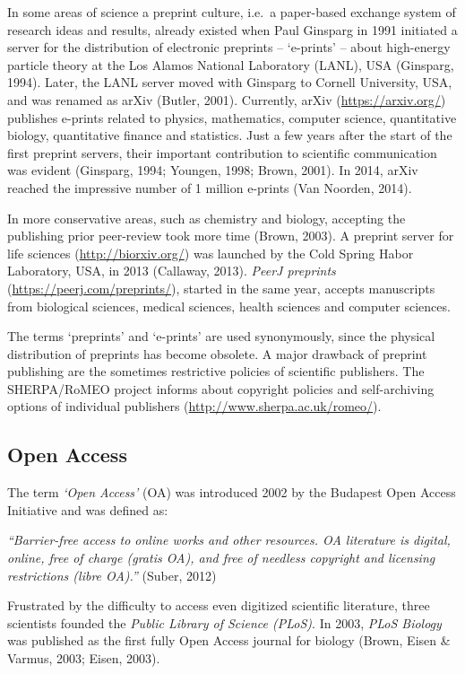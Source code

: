 \documentclass[10pt,fleqn]{wlpeerj}
\begin{document}
In some areas of science a preprint culture, i.e.~a paper-based exchange
system of research ideas and results, already existed when Paul Ginsparg
in 1991 initiated a server for the distribution of electronic preprints
-- `e-prints' -- about high-energy particle theory at the Los Alamos
National Laboratory (LANL), USA (Ginsparg, 1994). Later, the LANL server
moved with Ginsparg to Cornell University, USA, and was renamed as arXiv
(Butler, 2001). Currently, arXiv (\url{https://arxiv.org/}) publishes
e-prints related to physics, mathematics, computer science, quantitative
biology, quantitative finance and statistics. Just a few years after the
start of the first preprint servers, their important contribution to
scientific communication was evident (Ginsparg, 1994; Youngen, 1998;
Brown, 2001). In 2014, arXiv reached the impressive number of 1 million
e-prints (Van Noorden, 2014).

In more conservative areas, such as chemistry and biology, accepting the
publishing prior peer-review took more time (Brown, 2003). A preprint
server for life sciences (\url{http://biorxiv.org/}) was launched by the
Cold Spring Habor Laboratory, USA, in 2013 (Callaway, 2013). \emph{PeerJ
preprints} (\url{https://peerj.com/preprints/}), started in the same
year, accepts manuscripts from biological sciences, medical sciences,
health sciences and computer sciences.

The terms `preprints' and `e-prints' are used synonymously, since the
physical distribution of preprints has become obsolete. A major drawback
of preprint publishing are the sometimes restrictive policies of
scientific publishers. The SHERPA/RoMEO project informs about copyright
policies and self-archiving options of individual publishers
(\url{http://www.sherpa.ac.uk/romeo/}).

\subsection{Open Access}\label{open-access}

The term \emph{`Open Access'} (OA) was introduced 2002 by the Budapest
Open Access Initiative and was defined as:

\emph{``Barrier-free access to online works and other resources. OA
literature is digital, online, free of charge (gratis OA), and free of
needless copyright and licensing restrictions (libre OA).''} (Suber,
2012)

Frustrated by the difficulty to access even digitized scientific
literature, three scientists founded the \emph{Public Library of Science
(PLoS)}. In 2003, \emph{PLoS Biology} was published as the first fully
Open Access journal for biology (Brown, Eisen \& Varmus, 2003; Eisen,
2003).
\end{document}

